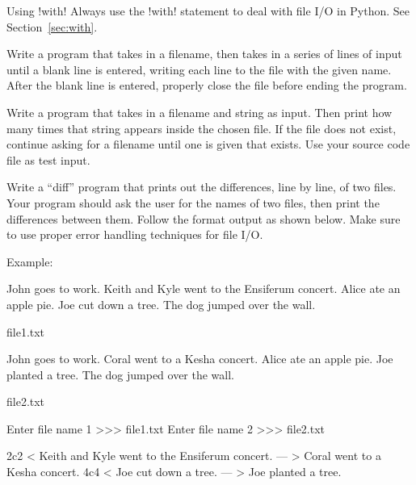 \documentclass[11pt]{cselabheader}
\begin{document}
\begin{warningbox}{Using \protect\pythoninline!with!}
  Always use the \pythoninline!with! statement to deal with file I/O in Python.
  See Section~\ref{sec:with}.
\end{warningbox}

\begin{ex}[save.py] Write a program that takes in a filename, then takes in
  a series of lines of input until a blank line is entered, writing each line to
  the file with the given name. After the blank line is entered, properly close
  the file before ending the program.
\end{ex}

\begin{ex} Write a program that
  takes in a filename and string as input. Then print how many times that string
  appears inside the chosen file. If the file does not exist, continue asking
  for a filename until one is given that exists. Use your source code file as
  test input.
\end{ex}

\begin{ex}[diff.py]
  Write a ``diff'' program that prints out the differences, line by line, of
  two files.  Your program should ask the user for the names of two files,
  then print the differences between them.  Follow the format output as shown
  below. Make sure to use proper error handling techniques for file I/O.

  Example:

  \begin{listing}[H]
    \vspace{-0.5em}
    \begin{verbatimcode}
John goes to work.
Keith and Kyle went to the Ensiferum concert.
Alice ate an apple pie.
Joe cut down a tree.
The dog jumped over the wall.
    \end{verbatimcode}
    \vspace{-0.5em}
    \caption{file1.txt}
    \vspace{-0.5em}
  \end{listing}

  \begin{listing}[H]
    \vspace{-0.5em}
    \begin{verbatimcode}
John goes to work.
Coral went to a Kesha concert.
Alice ate an apple pie.
Joe planted a tree.
The dog jumped over the wall.
    \end{verbatimcode}
    \vspace{-0.5em}
    \caption{file2.txt}
    \vspace{-0.5em}
  \end{listing}

  \begin{verbatimcode}
Enter file name 1 >>> file1.txt
Enter file name 2 >>> file2.txt

2c2
< Keith and Kyle went to the Ensiferum concert.
---
> Coral went to a Kesha concert.
4c4
< Joe cut down a tree.
---
> Joe planted a tree.
  \end{verbatimcode}
\end{ex}
\end{document}
